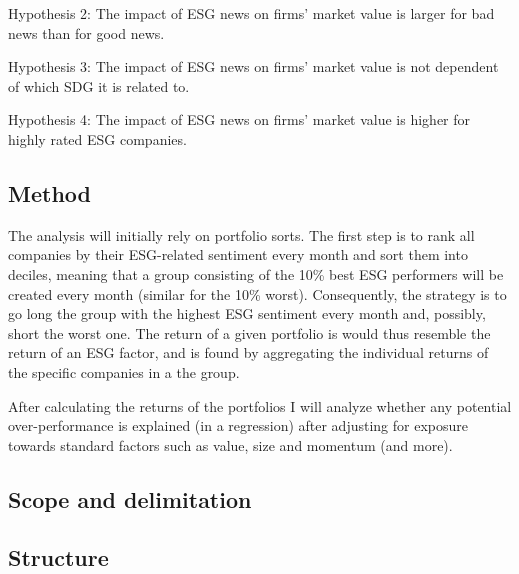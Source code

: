 Hypothesis 2:
The impact of ESG news on firms' market value is larger for bad news than for good news. 

Hypothesis 3: The impact of ESG news on firms' market value is not dependent of which SDG it is related to. 

Hypothesis 4: The impact of ESG news on firms' market value is higher for highly rated ESG companies. 

\subsection{Method}

The analysis will initially rely on portfolio sorts. The first step is to rank all companies by their ESG-related sentiment every month and sort them into deciles, meaning that a group consisting of the 10\% best ESG performers will be created every month (similar for the 10\% worst). Consequently, the strategy is to go long the group with the highest ESG sentiment every month and, possibly, short the worst one. The return of a given portfolio is would thus resemble the return of an ESG factor, and is found by aggregating the individual returns of the specific companies in a the group.  

After calculating the returns of the portfolios I will analyze whether any potential over-performance is explained (in a regression) after adjusting for exposure towards standard factors such as value, size and momentum (and more).
\subsection{Scope and delimitation}

\subsection{Structure}
